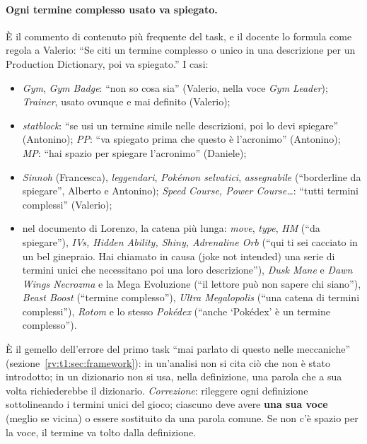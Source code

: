 \paragraph{Ogni termine complesso usato va spiegato.} È il commento di
contenuto più frequente del task, e il docente lo formula come regola a
Valerio: ``Se citi un termine complesso o unico in una descrizione per un
Production Dictionary, poi va spiegato.'' I casi:
\begin{itemize}
  \item \emph{Gym}, \emph{Gym Badge}: ``non so cosa sia'' (Valerio, nella
        voce \emph{Gym Leader}); \emph{Trainer}, usato ovunque e mai
        definito (Valerio);
  \item \emph{statblock}: ``se usi un termine simile nelle descrizioni, poi lo
        devi spiegare'' (Antonino); \emph{PP}: ``va spiegato prima che questo
        è l'acronimo'' (Antonino); \emph{MP}: ``hai spazio per spiegare
        l'acronimo'' (Daniele);
  \item \emph{Sinnoh} (Francesca), \emph{leggendari}, \emph{Pokémon
        selvatici}, \emph{assegnabile} (``borderline da spiegare'', Alberto e
        Antonino); \emph{Speed Course, Power Course\dots}: ``tutti termini
        complessi'' (Valerio);
  \item nel documento di Lorenzo, la catena più lunga: \emph{move},
        \emph{type}, \emph{HM} (``da spiegare''), \emph{IVs, Hidden Ability,
        Shiny, Adrenaline Orb} (``qui ti sei cacciato in un bel ginepraio.
        Hai chiamato in causa (joke not intended) una serie di termini unici
        che necessitano poi una loro descrizione''), \emph{Dusk Mane} e
        \emph{Dawn Wings Necrozma} e la Mega Evoluzione (``il lettore può non
        sapere chi siano''), \emph{Beast Boost} (``termine complesso''),
        \emph{Ultra Megalopolis} (``una catena di termini complessi''),
        \emph{Rotom} e lo stesso \emph{Pokédex} (``anche `Pokédex' è un
        termine complesso'').
\end{itemize}
È il gemello dell'errore del primo task ``mai parlato di questo nelle
meccaniche'' (sezione~\ref{rv:t1:sec:framework}): in un'analisi non si cita
ciò che non è stato introdotto; in un dizionario non si usa, nella
definizione, una parola che a sua volta richiederebbe il dizionario.
\emph{Correzione}: rileggere ogni definizione sottolineando i termini unici
del gioco; ciascuno deve avere \textbf{una sua voce} (meglio se vicina) o
essere sostituito da una parola comune. Se non c'è spazio per la voce, il
termine va tolto dalla definizione.

